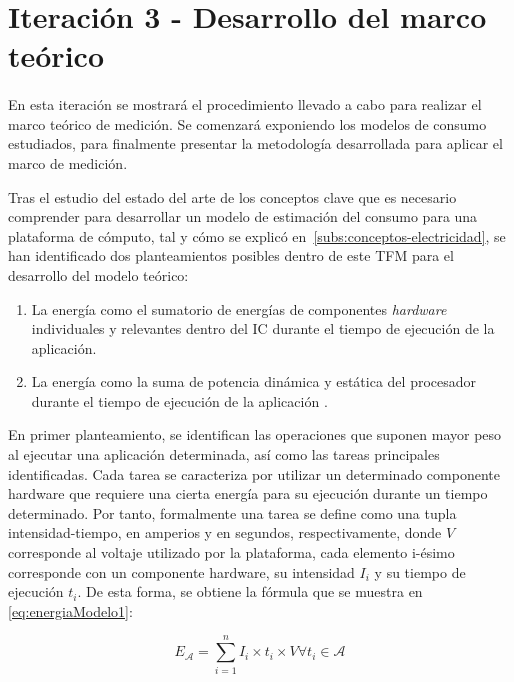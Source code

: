 \section{Iteración 3 - Desarrollo del marco teórico}

\paragraph{}{
\label{estadoArteModelos}
En esta iteración se mostrará el procedimiento llevado a cabo para realizar el marco teórico de medición. Se comenzará exponiendo los modelos de consumo estudiados, para finalmente presentar la metodología desarrollada para aplicar el marco de medición.

Tras el estudio del estado del arte de los conceptos clave que es necesario comprender para desarrollar un modelo de estimación del consumo para una plataforma de cómputo, tal y cómo se explicó en~\ref{subs:conceptos-electricidad}, se han identificado dos planteamientos posibles dentro de este \ac{TFM} para el desarrollo del modelo teórico:

\begin{enumerate}
    \item La energía como el sumatorio de energías de componentes \textit{hardware} individuales y relevantes dentro del \ac{IC} durante el tiempo de ejecución de la aplicación.
    
    \item La energía como la suma de potencia dinámica y estática del procesador durante el tiempo de ejecución de la aplicación .
\end{enumerate}


En primer planteamiento, se identifican las operaciones que suponen mayor peso al ejecutar una aplicación determinada, así como las tareas principales identificadas. Cada tarea se caracteriza por utilizar un determinado componente hardware que requiere una cierta energía para su ejecución durante un tiempo determinado. Por tanto, formalmente una tarea se define como una tupla intensidad-tiempo, en amperios y en segundos, respectivamente, donde $V$ corresponde al voltaje utilizado por la plataforma, cada elemento i-ésimo corresponde con un componente hardware, su intensidad $I_i$ y su tiempo de ejecución $t_i$. De esta forma, se obtiene la fórmula que se muestra en \ref{eq:energiaModelo1}:

\begin{equation}
    E_\mathcal{A}=\sum_{i=1}^n I_i \times t_i \times V \forall t_i  \in \mathcal{A}
    \label{eq:energiaModelo1}
\end{equation}

}
